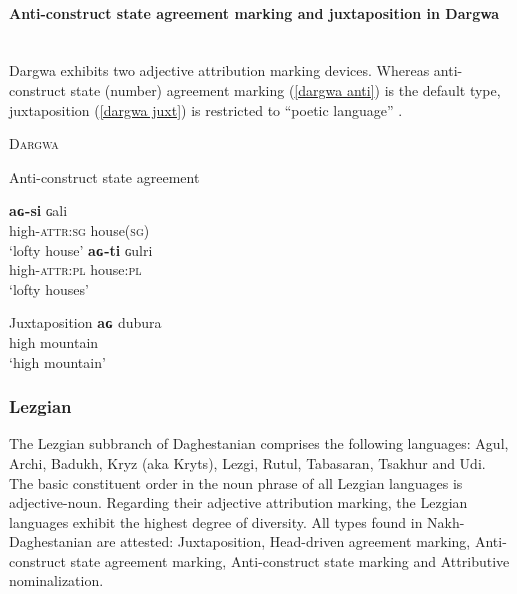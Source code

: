 \paragraph{Anti-construct state agreement marking and juxtaposition in Dargwa}\hspace{1cm}\\
Dargwa exhibits two adjective attribution marking devices. Whereas anti-construct state (number) agreement marking (\ref{dargwa anti}) is the default type, juxtaposition (\ref{dargwa juxt}) is restricted to “poetic language” \citep[318]{isaev2004}.
\begin{exe}
\ex \textsc{Dargwa} \citep[318]{isaev2004}
\begin{xlist}
\ex Anti-construct state agreement \label{dargwa anti}
\begin{xlist}
\ex
\gll	\textbf{aɢ-si} ɢali\\
	high-\textsc{attr:sg} house(\textsc{sg})\\
\glt	‘lofty house’
\ex
\gll	\textbf{aɢ-ti} ɢulri\\
	high-\textsc{attr:pl} house:\textsc{pl}\\
\glt	‘lofty houses’
\end{xlist}
\ex Juxtaposition \label{dargwa juxt}
\gll	\textbf{aɢ} dubura\\
	high mountain\\
\glt	‘high mountain’
\end{xlist}
\end{exe}

\subsubsection{Lezgian}\label{lezgian synchr}
The Lezgian subbranch of Daghestanian comprises the following languages: Agul, Archi, Badukh, Kryz (aka Kryts), Lezgi, Rutul, Tabasaran, Tsakhur and Udi.\\

\noindent The basic constituent order in the noun phrase of all Lezgian languages is adjective-noun. Regarding their adjective attribution marking, the Lezgian languages exhibit the highest degree of diversity. All types found in Nakh-Daghestanian are attested: Juxtaposition, Head-driven agreement marking, Anti-construct state agreement marking, Anti-construct state marking and Attributive nominalization.

